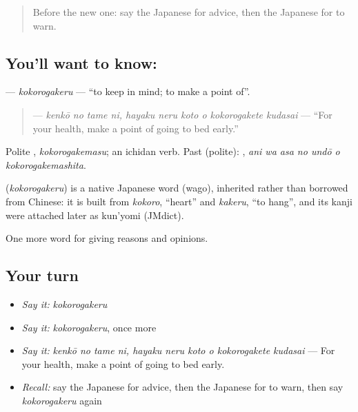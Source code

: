 \label{lesson:JA-C340-kokorogakeru}



\begin{quote}
Before the new one: say the Japanese for advice, then the Japanese for to warn.
\end{quote}

\subsection*{You'll want to know: }
\textbf{} — \emph{kokorogakeru} — \textquotedblleft{}to keep in mind; to make a point of\textquotedblright{}.

\begin{quote}
\textbf{     } — \emph{kenkō no tame ni, hayaku neru koto o kokorogakete kudasai} — \textquotedblleft{}For your health, make a point of going to bed early.\textquotedblright{}
\end{quote}

Polite \textbf{}, \emph{kokorogakemasu}; an ichidan verb. Past (polite): \textbf{   }, \emph{ani wa asa no undō o kokorogakemashita}.

\begin{cousinweb}
\textbf{} (\emph{kokorogakeru}) is a native Japanese word (wago), inherited rather than borrowed from Chinese: it is built from \emph{kokoro}, \textquotedblleft{}heart\textquotedblright{} and \emph{kakeru}, \textquotedblleft{}to hang\textquotedblright{}, and its kanji were attached later as kun'yomi (JMdict).
\end{cousinweb}

\begin{grammarlens}[title={What you've built}]
One more word for giving reasons and opinions.
\end{grammarlens}

\subsection*{Your turn}
\begin{itemize}
\raggedright
  \item \emph{Say it:} \emph{kokorogakeru}
  \item \emph{Say it:} \emph{kokorogakeru}, once more
  \item \emph{Say it:} \emph{kenkō no tame ni, hayaku neru koto o kokorogakete kudasai} — For your health, make a point of going to bed early.
  \item \emph{Recall:} say the Japanese for advice, then the Japanese for to warn, then say \emph{kokorogakeru} again
\end{itemize}

